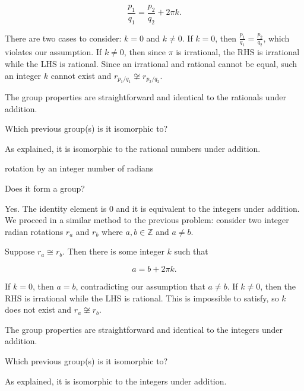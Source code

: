\documentclass[../key.tex]{subfiles}
\begin{document}
$$\frac{p_1}{q_1} = \frac{p_2}{q_2} + 2\pi k.$$

\noindent There are two cases to consider: $k=0$ and $k\neq 0$. If $k=0$, then $\frac{p_1}{q_1} = \frac{p_2}{q_2}$, which violates our assumption. If $k\neq 0$, then since $\pi$ is irrational, the RHS is irrational while the LHS is rational. Since an irrational and rational cannot be equal, such an integer $k$ cannot exist and $r_{p_1/q_1}\not\cong r_{p_2/q_2}$.

The group properties are straightforward and identical to the rationals under addition.

\begin{iinner_problem}
\item Which previous group(s) is it isomorphic to?
\end{iinner_problem}

\noindent As explained, it is isomorphic to the rational numbers under addition.

\begin{inner_problem}
\item rotation by an integer number of radians
\end{inner_problem}

\begin{iinner_problem}[start=1]
\item Does it form a group?
\end{iinner_problem}

\noindent Yes. The identity element is $0$ and it is equivalent to the integers under addition. We proceed in a similar method to the previous problem: consider two integer radian rotations $r_a$ and $r_b$ where $a,b\in \mathbb{Z}$ and $a\neq b$.

Suppose $r_a\cong r_b$. Then there is some integer $k$ such that

$$a=b+2\pi k.$$

\noindent If $k=0$, then $a=b$, contradicting our assumption that $a\neq b$. If $k\neq 0$, then the RHS is irrational while the LHS is rational. This is impossible to satisfy, so $k$ does not exist and $r_a\not\cong r_b$.

The group properties are straightforward and identical to the integers under addition.

\begin{iinner_problem}
\item Which previous group(s) is it isomorphic to?
\end{iinner_problem}

\noindent As explained, it is isomorphic to the integers under addition.
\end{document}
